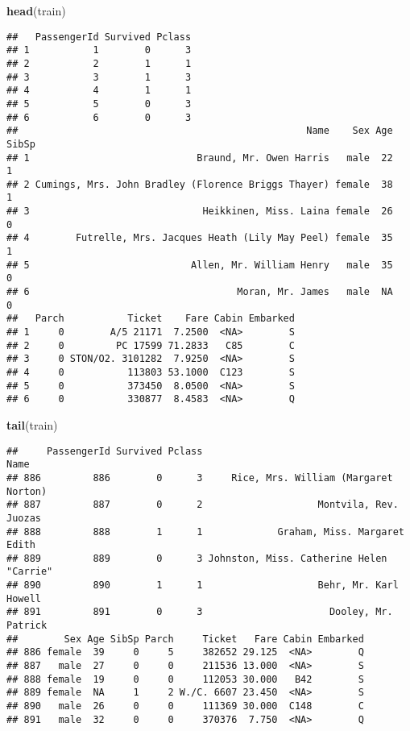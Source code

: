 \documentclass[]{article}
\newenvironment{Shaded}{\begin{snugshade}}{\end{snugshade}}
\newcommand{\KeywordTok}[1]{\textcolor[rgb]{0.13,0.29,0.53}{\textbf{#1}}}
\newcommand{\NormalTok}[1]{#1}
\begin{document}
\begin{Shaded}
\begin{Highlighting}[]
\KeywordTok{head}\NormalTok{(train)}
\end{Highlighting}
\end{Shaded}

\begin{verbatim}
##   PassengerId Survived Pclass
## 1           1        0      3
## 2           2        1      1
## 3           3        1      3
## 4           4        1      1
## 5           5        0      3
## 6           6        0      3
##                                                  Name    Sex Age SibSp
## 1                             Braund, Mr. Owen Harris   male  22     1
## 2 Cumings, Mrs. John Bradley (Florence Briggs Thayer) female  38     1
## 3                              Heikkinen, Miss. Laina female  26     0
## 4        Futrelle, Mrs. Jacques Heath (Lily May Peel) female  35     1
## 5                            Allen, Mr. William Henry   male  35     0
## 6                                    Moran, Mr. James   male  NA     0
##   Parch           Ticket    Fare Cabin Embarked
## 1     0        A/5 21171  7.2500  <NA>        S
## 2     0         PC 17599 71.2833   C85        C
## 3     0 STON/O2. 3101282  7.9250  <NA>        S
## 4     0           113803 53.1000  C123        S
## 5     0           373450  8.0500  <NA>        S
## 6     0           330877  8.4583  <NA>        Q
\end{verbatim}

\begin{Shaded}
\begin{Highlighting}[]
\KeywordTok{tail}\NormalTok{(train)}
\end{Highlighting}
\end{Shaded}

\begin{verbatim}
##     PassengerId Survived Pclass                                     Name
## 886         886        0      3     Rice, Mrs. William (Margaret Norton)
## 887         887        0      2                    Montvila, Rev. Juozas
## 888         888        1      1             Graham, Miss. Margaret Edith
## 889         889        0      3 Johnston, Miss. Catherine Helen "Carrie"
## 890         890        1      1                    Behr, Mr. Karl Howell
## 891         891        0      3                      Dooley, Mr. Patrick
##        Sex Age SibSp Parch     Ticket   Fare Cabin Embarked
## 886 female  39     0     5     382652 29.125  <NA>        Q
## 887   male  27     0     0     211536 13.000  <NA>        S
## 888 female  19     0     0     112053 30.000   B42        S
## 889 female  NA     1     2 W./C. 6607 23.450  <NA>        S
## 890   male  26     0     0     111369 30.000  C148        C
## 891   male  32     0     0     370376  7.750  <NA>        Q
\end{verbatim}
\end{document}
